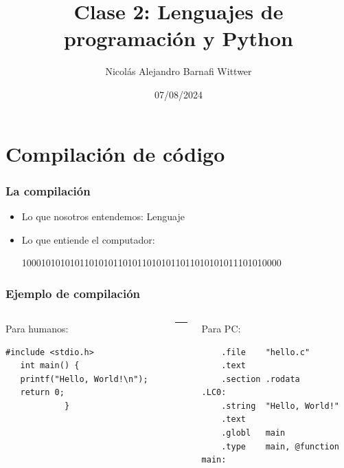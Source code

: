 \documentclass[14pt,aspectratio=169,xcolor=dvipsnames]{beamer}
\title[short title]{Clase 2: Lenguajes de programación y Python}
\subtitle{}
\author[NA Barnafi] {Nicolás Alejandro Barnafi Wittwer}
\institute[UC|CMM] 
{
    Pontificia Universidad Católica de Chile \\
    Centro de Modelamiento Matemático
}
\date{07/08/2024}
\begin{document}
\begin{frame}
    \maketitle
\end{frame}
\section{Compilación de código}
\begin{frame}[t]\frametitle{La compilación}

    \vspace{1cm}
    \begin{itemize}
        \item<+-> Lo que nosotros entendemos: Lenguaje
        \item<+-> Lo que entiende el computador: 
    
        100010101010110101011010110101011011010101011101010000
            
    \end{itemize}
\end{frame}
\begin{frame}[fragile]\frametitle{Ejemplo de compilación}
\begin{small}
    \begin{columns}[t]
        \begin{column}[b]{0.4\textwidth}
            Para humanos:
            \vspace{2.0cm}
            \begin{verbatim}
#include <stdio.h>
   int main() {
   printf("Hello, World!\n");
   return 0;
            }
            \end{verbatim}

    \vfill
        \end{column}
        \begin{column}{0.01\textwidth}
            \rule{0.4pt}{6cm}

        \end{column}
        \begin{column}[b]{0.45\textwidth}
            Para PC: 
            \begin{verbatim}
    .file    "hello.c"
    .text
    .section .rodata
.LC0:
    .string  "Hello, World!"
    .text
    .globl   main
    .type    main, @function
main:
            \end{verbatim}

    \vfill
        \end{column}
    \end{columns}
\end{small}
\end{frame}
\end{document}
